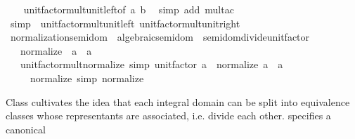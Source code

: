 \begin{isabellebody}
%
\isadelimproof
\ \ %
\endisadelimproof
%
\isatagproof
{}\isamarkupfalse%
\ unit{\isacharunderscore}{\kern0pt}factor{\isacharunderscore}{\kern0pt}mult{\isacharunderscore}{\kern0pt}unit{\isacharunderscore}{\kern0pt}left{\isacharbrackleft}{\kern0pt}of\ a\ b{\isacharbrackright}{\kern0pt}\ \isamarkupfalse%
\ {\isacharparenleft}{\kern0pt}simp\ add{\isacharcolon}{\kern0pt}\ mult{\isacharunderscore}{\kern0pt}ac{\isacharparenright}{\kern0pt}%
\endisatagproof
{\isafoldproof}%
%
\isadelimproof
\isanewline
%
\endisadelimproof
\isanewline
{}\isamarkupfalse%
\ {\isacharbrackleft}{\kern0pt}simp{\isacharbrackright}{\kern0pt}\ {\isacharequal}{\kern0pt}\ unit{\isacharunderscore}{\kern0pt}factor{\isacharunderscore}{\kern0pt}mult{\isacharunderscore}{\kern0pt}unit{\isacharunderscore}{\kern0pt}left\ unit{\isacharunderscore}{\kern0pt}factor{\isacharunderscore}{\kern0pt}mult{\isacharunderscore}{\kern0pt}unit{\isacharunderscore}{\kern0pt}right\isanewline
\isanewline
{}\isamarkupfalse%
\isanewline
\isanewline
{}\isamarkupfalse%
\ normalization{\isacharunderscore}{\kern0pt}semidom\ {\isacharequal}{\kern0pt}\ algebraic{\isacharunderscore}{\kern0pt}semidom\ {\isacharplus}{\kern0pt}\ semidom{\isacharunderscore}{\kern0pt}divide{\isacharunderscore}{\kern0pt}unit{\isacharunderscore}{\kern0pt}factor\ {\isacharplus}{\kern0pt}\isanewline
\ \ \ normalize\ {\isacharcolon}{\kern0pt}{\isacharcolon}{\kern0pt}\ {\isachardoublequoteopen}{\isacharprime}{\kern0pt}a\ {\isasymRightarrow}\ {\isacharprime}{\kern0pt}a{\isachardoublequoteclose}\isanewline
\ \ \ unit{\isacharunderscore}{\kern0pt}factor{\isacharunderscore}{\kern0pt}mult{\isacharunderscore}{\kern0pt}normalize\ {\isacharbrackleft}{\kern0pt}simp{\isacharbrackright}{\kern0pt}{\isacharcolon}{\kern0pt}\ {\isachardoublequoteopen}unit{\isacharunderscore}{\kern0pt}factor\ a\ {\isacharasterisk}{\kern0pt}\ normalize\ a\ {\isacharequal}{\kern0pt}\ a{\isachardoublequoteclose}\isanewline
\ \ \ \ \ normalize{\isacharunderscore}{\kern0pt}{}\ {\isacharbrackleft}{\kern0pt}simp{\isacharbrackright}{\kern0pt}{\isacharcolon}{\kern0pt}\ {\isachardoublequoteopen}normalize\ {}\ {\isacharequal}{\kern0pt}\ {}{\isachardoublequoteclose}\isanewline
{}%
\begin{isamarkuptext}%
Class  cultivates the idea that each integral
  domain can be split into equivalence classes whose representants are
  associated, i.e. divide each other.  specifies a canonical

\end{isamarkuptext}
\end{isabellebody}
